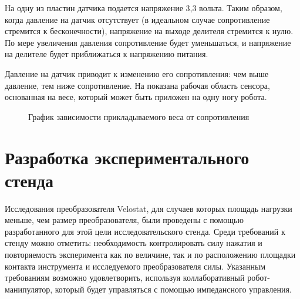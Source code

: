 На одну из пластин датчика подается напряжение 3,3 вольта. Таким образом, когда давление на датчик отсутствует (в идеальном случае сопротивление стремится к бесконечности), напряжение на выходе делителя стремится к нулю. По мере увеличения давления сопротивление будет уменьшаться, и напряжение на делителе будет приближаться к напряжению питания.

 Давление на датчик приводит к изменению его сопротивления: чем выше давление, тем ниже сопротивление. На  показана рабочая область сенсора, основанная на весе, который может быть приложен на одну ногу робота.
\begin{figure}[H]
    \centering
    \caption{График зависимости прикладываемого веса от сопротивления}
    \label{fig:velostat_pressure_resistance.jpg}
\end{figure}

\section{Разработка экспериментального стенда}

Исследования преобразователя Velostat, для случаев которых площадь нагрузки меньше, чем размер преобразователя, были проведены с помощью разработанного для этой цели исследовательского стенда. Среди требований к стенду можно отметить: необходимость контролировать силу нажатия и повторяемость эксперимента как по величине, так и по расположению площадки контакта инструмента и исследуемого преобразователя силы. Указанным требованиям возможно удовлетворить, используя коллаборативный робот-манипулятор, который будет управляться с помощью импедансного управления.

